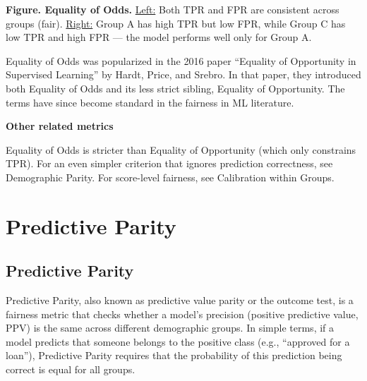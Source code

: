 \textbf{Figure. Equality of Odds.} \underline{Left:} Both TPR and FPR are consistent across groups (fair). \underline{Right:} Group A has high TPR but low FPR, while Group C has low TPR and high FPR — the model performs well only for Group A.

{Equality of Odds was popularized in the 2016 paper “Equality of Opportunity in Supervised Learning” by Hardt, Price, and Srebro. 
In that paper, they introduced both Equality of Odds and its less strict sibling, Equality of Opportunity. The terms have since become standard
in the fairness in ML literature.}

\textbf{Other related metrics}

Equality of Odds is stricter than Equality of Opportunity (which only constrains TPR). For an even simpler criterion that ignores
prediction correctness, see Demographic Parity. For score-level fairness, see Calibration within Groups.


\clearpage
\thispagestyle{biasfairnesstyle}
\section{Predictive Parity}
\subsection{Predictive Parity}


Predictive Parity, also known as predictive value parity or the outcome test, is a fairness metric that checks whether a model’s precision 
(positive predictive value, PPV) is the same across different demographic groups. In simple terms, if a model predicts that someone belongs to
the positive class (e.g., “approved for a loan”), Predictive Parity requires that the probability of this prediction being correct is equal for
all groups.

\begin{center}
\end{center}

